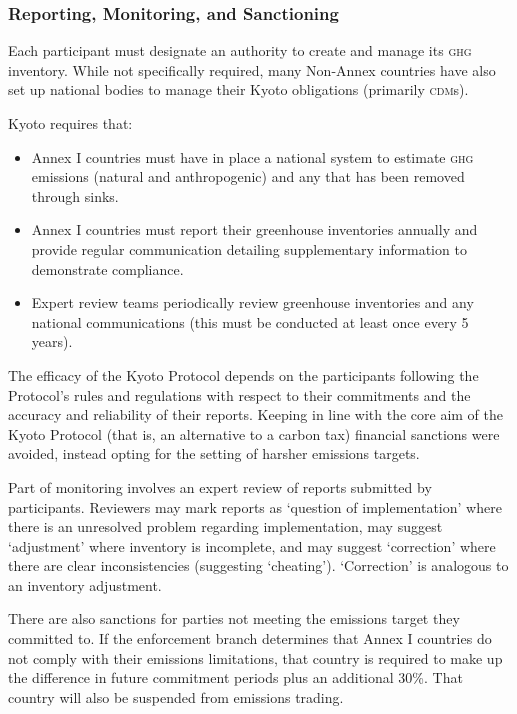 \subsubsection{Reporting, Monitoring, and Sanctioning}

Each participant must designate an authority to create and manage its \textsc{ghg} inventory. While not specifically required, many Non-Annex countries have also set up national bodies to manage their Kyoto obligations (primarily \textsc{cdm}s).

Kyoto requires that:~\cite{UNFCCC-Kyoto-guidelines}

\begin{itemize}
	\item Annex I countries must have in place a national system to estimate \textsc{ghg} emissions (natural and anthropogenic) and any \CO that has been removed through sinks.
	\item Annex I countries must report their greenhouse inventories annually and provide regular communication detailing supplementary information to demonstrate compliance.
	\item Expert review teams periodically review greenhouse inventories and any national communications (this must be conducted at least once every 5 years).
\end{itemize}

The efficacy of the Kyoto Protocol depends on the participants following the Protocol's rules and regulations with respect to their commitments and the accuracy and reliability of their reports. Keeping in line with the core aim of the Kyoto Protocol (that is, an alternative to a carbon tax) financial sanctions were avoided, instead opting for the setting of harsher emissions targets.

Part of monitoring involves an expert review of reports submitted by participants. Reviewers may mark reports as `question of implementation' where there is an unresolved problem regarding implementation, may suggest `adjustment' where inventory is incomplete, and may suggest `correction' where there are clear inconsistencies (suggesting `cheating'). `Correction' is analogous to an inventory adjustment.~\cite{UNFCCC-reporting-review}

There are also sanctions for parties not meeting the emissions target they committed to. If the enforcement branch determines that Annex I countries do not comply with their emissions limitations, that country is required to make up the difference in future commitment periods plus an additional 30\%. That country will also be suspended from emissions trading.~\cite{UNFCCC-compliance}


